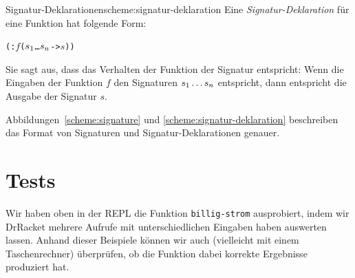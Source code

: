 \begin{feature}{Signatur-Deklarationen}{scheme:signatur-deklaration}
Eine \textit{Signatur-Deklaration} für
eine Funktion hat
folgende Form:
%
\begin{alltt}
(: \(f\) (\(s\sb{1}\) \ldots \(s\sb{n}\) -> \(s\)))
\end{alltt}
%
Sie sagt aus, dass das Verhalten der Funktion der Signatur entspricht:
Wenn die Eingaben der Funktion $f$ den Signaturen \(s\sb{1} \ldots
s\sb{n}\) entspricht, dann entspricht die Ausgabe der Signatur $s$.
\end{feature}
%
Abbildungen~\ref{scheme:signature} und
\ref{scheme:signatur-deklaration} beschreiben das Format von Signaturen
und Signatur-Deklarationen genauer.

\section{Tests}

Wir haben oben in der REPL die Funktion
\texttt{billig-strom} ausprobiert, indem wir DrRacket mehrere Aufrufe
mit unterschiedlichen Eingaben haben auswerten lassen.  Anhand dieser
Beispiele können wir auch (vielleicht mit einem Taschenrechner)
überprüfen, ob die Funktion dabei korrekte Ergebnisse produziert hat.

